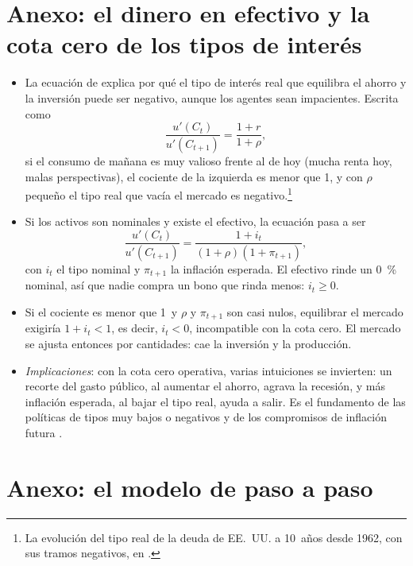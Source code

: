 \documentclass[11pt]{article}
\begin{document}
\section{Anexo: el dinero en efectivo\cortetitulo{} y la cota cero de los tipos de interés}\label{anexo:cota-cero}

\begin{itemize}
\item La ecuación de  explica por qué el tipo de interés real que equilibra el ahorro y la inversión puede ser negativo, aunque los agentes sean impacientes. Escrita como
  \begin{equation*}
  \frac{u'(C_t)}{u'(C_{t+1})}=\frac{1+r}{1+\rho},
  \end{equation*}
  si el consumo de mañana es muy valioso frente al de hoy (mucha renta hoy, malas perspectivas), el cociente de la izquierda es menor que 1, y con $\rho$ pequeño el tipo real que vacía el mercado es negativo.\footnote{La evolución del tipo real de la deuda de EE.~UU. a 10~años desde 1962, con sus tramos negativos, en \textcite{Esteve2023Tipos}.}
\item Si los activos son nominales y existe el efectivo, la ecuación pasa a ser
  \begin{equation*}
  \frac{u'(C_t)}{u'(C_{t+1})}=\frac{1+i_t}{(1+\rho)(1+\pi_{t+1})},
  \end{equation*}
  con $i_t$ el tipo nominal y $\pi_{t+1}$ la inflación esperada. El efectivo rinde un 0~\% nominal, así que nadie compra un bono que rinda menos: $i_t\geq0$.
\item Si el cociente es menor que 1~y $\rho$ y $\pi_{t+1}$ son casi nulos, equilibrar el mercado exigiría $1+i_t<1$, es decir, $i_t<0$, incompatible con la cota cero. El mercado se ajusta entonces por cantidades: cae la inversión y la producción\nocite{Krugman1998Baaack}.
\item \emph{Implicaciones}: con la cota cero operativa, varias intuiciones se invierten: un recorte del gasto público, al aumentar el ahorro, agrava la recesión, y más inflación esperada, al bajar el tipo real, ayuda a salir. Es el fundamento de las políticas de tipos muy bajos o negativos y de los compromisos de inflación futura  .
\end{itemize}

\section{Anexo: el modelo de  paso a paso}\label{anexo:diamond}
\end{document}
